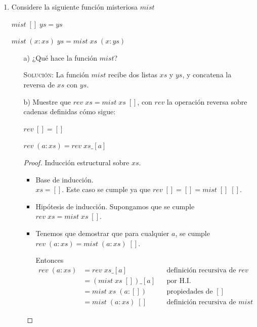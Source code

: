 \documentclass[letterpaper,11pt]{article}
\begin{document}
\begin{enumerate}
    \item Considere la siguiente función misteriosa $mist$
    \begin{center}
        $mist \; [] \; ys = ys$

        $mist \; (x : xs) \;  ys = mist \; xs \; (x : ys)$
    \end{center}

    \begin{itemize}
        \item[a)] ¿Qué hace la función $mist$?

        \textsc{Solución:} La función $mist$ recibe dos listas $xs$ y $ys$, y 
        concatena la reversa de $xs$ con $ys$.

        \item[b)] Muestre que $rev \; xs = mist \; xs \; []$, con $rev$ la 
        operación reversa sobre cadenas definidas cómo sigue: 
        \begin{center}
            $rev \; [] = []$

            $rev \; (a : xs) = rev \; xs\_[a]$
        \end{center}

        \begin{proof}
            Inducción estructural sobre $xs$.

            \begin{itemize}
                \item Base de inducción. \\ 
                $xs = []$. Este caso se cumple ya que $rev \; [] = [] =
                mist \; [] \; []$.

                \item Hipótesis de inducción. Supongamos que se cumple 
                $rev \; xs = mist \; xs \; []$.

                \item Tenemos que demostrar que para cualquier $a$, se cumple
                $rev \; (a:xs) = mist \; (a:xs) \; []$.

                Entonces 
                \begin{align*}
                    rev \; (a:xs)
                    &= rev \; xs\_[a]
                    && \text{definición recursiva de $rev$} \\
                    &= (mist \; xs \; [])\_[a]
                    && \text{por H.I.} \\ 
                    &= mist \; xs \; (a:[]) 
                    && \text{propiedades de $[]$} \\ 
                    &= mist \; (a: xs) \; []
                    && \text{definición recursiva de $mist$}
                \end{align*}
            \end{itemize}
        \end{proof}
    \end{itemize}


\end{enumerate}
\end{document}
